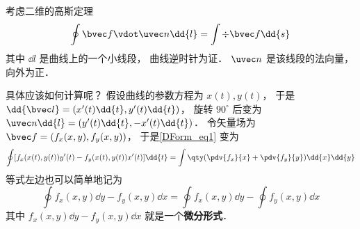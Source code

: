 

考虑二维的高斯定理
\begin{equation}\label{DForm_eq1}
\oint \bvec f \vdot \uvec n \dd{l} = \int \div \bvec f \dd{s}
\end{equation}
其中 $\dd{l}$ 是曲线上的一个小线段， 曲线逆时针为证． $\uvec n$ 是该线段的法向量， 向外为正．

具体应该如何计算呢？ 假设曲线的参数方程为 $x(t), y(t)$， 于是 $\dd{\bvec l} = (x'(t)\dd{t}, y'(t)\dd{t})$， 旋转 $90^\circ$ 后变为 $\uvec n \dd{l} = (y'(t)\dd{t}, -x'(t)\dd{t})$． 令矢量场为 $\bvec f = (f_x(x,y), f_y(x,y))$， 于是\autoref{DForm_eq1} 变为
\begin{equation}
\oint [f_x(x(t),y(t)) y'(t) - f_y(x(t),y(t)) x'(t)]\dd{t}
= \int \qty(\pdv{f_x}{x} + \pdv{f_y}{y}) \dd{x}\dd{y}
\end{equation}
等式左边也可以简单地记为
\begin{equation}
\oint f_x(x,y) \dd{y} - f_y(x,y) \dd{x} = \oint f_x(x,y) \dd{y} - \oint f_y(x,y) \dd{x}
\end{equation}
其中 $f_x(x,y) \dd{y} - f_y(x,y) \dd{x}$ 就是一个\textbf{微分形式}．
